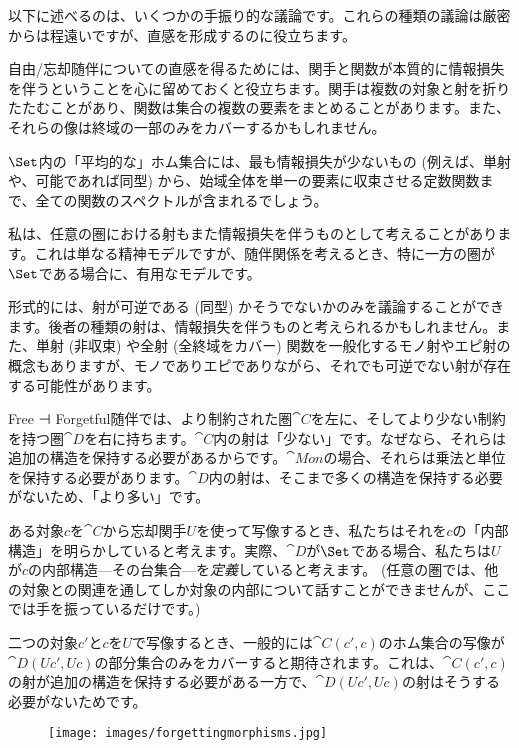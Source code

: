 以下に述べるのは、いくつかの手振り的な議論です。これらの種類の議論は厳密からは程遠いですが、直感を形成するのに役立ちます。

自由/忘却随伴についての直感を得るためには、関手と関数が本質的に情報損失を伴うということを心に留めておくと役立ちます。関手は複数の対象と射を折りたたむことがあり、関数は集合の複数の要素をまとめることがあります。また、それらの像は終域の一部のみをカバーするかもしれません。

$\Set$内の「平均的な」ホム集合には、最も情報損失が少ないもの (例えば、単射や、可能であれば同型) から、始域全体を単一の要素に収束させる定数関数まで、全ての関数のスペクトルが含まれるでしょう。

私は、任意の圏における射もまた情報損失を伴うものとして考えることがあります。これは単なる精神モデルですが、随伴関係を考えるとき、特に一方の圏が$\Set$である場合に、有用なモデルです。

形式的には、射が可逆である (同型) かそうでないかのみを議論することができます。後者の種類の射は、情報損失を伴うものと考えられるかもしれません。また、単射 (非収束) や全射 (全終域をカバー) 関数を一般化するモノ射やエピ射の概念もありますが、モノでありエピでありながら、それでも可逆でない射が存在する可能性があります。

Free ⊣ Forgetful随伴では、より制約された圏$\cat{C}$を左に、そしてより少ない制約を持つ圏$\cat{D}$を右に持ちます。$\cat{C}$内の射は「少ない」です。なぜなら、それらは追加の構造を保持する必要があるからです。$\cat{Mon}$の場合、それらは乗法と単位を保持する必要があります。$\cat{D}$内の射は、そこまで多くの構造を保持する必要がないため、「より多い」です。

ある対象$c$を$\cat{C}$から忘却関手$U$を使って写像するとき、私たちはそれを$c$の「内部構造」を明らかしていると考えます。実際、$\cat{D}$が$\Set$である場合、私たちは$U$が$c$の内部構造---その台集合---を\emph{定義}していると考えます。 (任意の圏では、他の対象との関連を通してしか対象の内部について話すことができませんが、ここでは手を振っているだけです。) 

二つの対象$c'$と$c$を$U$で写像するとき、一般的には$\cat{C}(c', c)$のホム集合の写像が$\cat{D}(U c', U c)$の部分集合のみをカバーすると期待されます。これは、$\cat{C}(c', c)$の射が追加の構造を保持する必要がある一方で、$\cat{D}(U c', U c)$の射はそうする必要がないためです。

\begin{figure}[H]
  \centering
  \texttt{[image: images/forgettingmorphisms.jpg]}
\end{figure}

